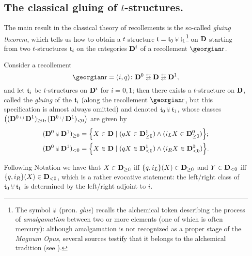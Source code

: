 \subsection{The classical gluing of $t$\hyp{}structures.}\label{classrec}
The main result in the classical theory of recollements is the so\hyp{}called \emph{gluing theorem}, which tells us how to obtain a $t$\hyp{}structure $\tee = \tee_0 \glue \tee_1$\footnote{The symbol $\smallglue$ (pron. \emph{glue}) recalls the alchemical token describing the process of \emph{amalgamation} between two or more elements (one of which is often mercury): although amalgamation is not recognized as a proper stage of the \emph{Magnum Opus}, several sources testify that it belongs to the alchemical tradition (see \cite[pp. \textbf{409-498}]{roth1976deutsches}).} on $\mathbf{D}$ starting from two $t$\hyp{}structures $\mathfrak{t}_i$ on the categories $\mathbf{D}^i$ of a recollement $\rec$.
\begin{theorem}\label{gluing}
Consider a recollement $$\rec = (i,q)\colon \D^0 \lrlarrows  \D \lrlarrows  \D^1,$$ and let $\mathfrak{t}_i$ be $t$\hyp{}structures on $\mathbf{D}^i$ for $i=0,1$; then there exists a $t$\hyp{}structure on $\mathbf{D}$, called the \emph{gluing} of the $\mathfrak{t}_i$ (along the recollement $\rec$, but this specification is almost always omitted) and denoted $\tee_0\glue \tee_1$, whose classes $\big( (\D^0\glue \D^1)_{\ge 0}, (\D^0\glue \D^1)_{<0}\big)$ are given by
\begin{align}
(\D^0\glue \D^1)_{\ge 0} &= \Big\{ X\in\D\mid (q X\in \D_{\ge 0}^1)\land (i_L X\in \D_{\ge 0}^0) \Big\};\notag \\
(\D^0\glue \D^1)_{<0} &= \Big\{ X\in\D\mid ( q X\in \D_{< 0}^1)\land (i_R X\in \D_{< 0}^0) \Big\}.\label{glued}
\end{align}
\end{theorem}
\begin{remark}
Following Notation  we have that $X\in \mathbf{D}_{\ge 0}$ iff $\{q, i_L\}(X)\in \mathbf{D}_{\ge 0}$  and $Y\in \mathbf{D}_{<0}$ iff $\{q, i_R\}(X)\in \mathbf{D}_{<0}$, which is a rather evocative statement: the left/right class of $\tee_0\glue \tee_1$ is determined by the left/right adjoint to $i$.
\end{remark}

